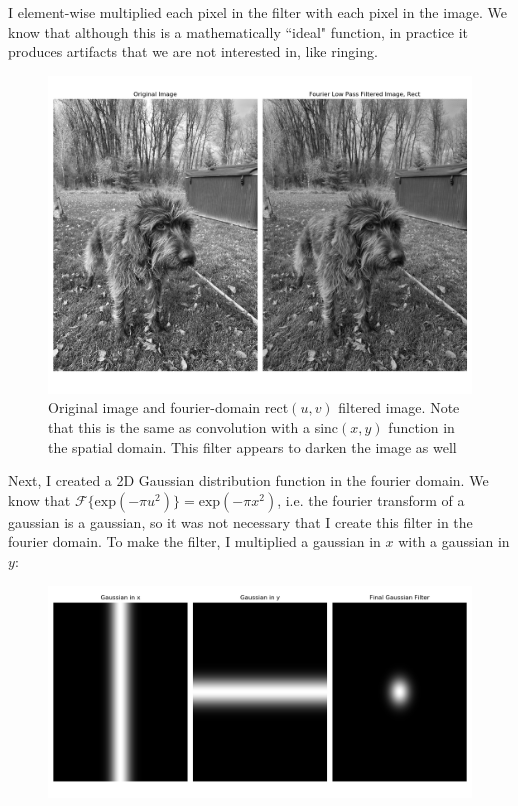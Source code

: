 \documentclass[]{article}
\begin{document}
	
	I element-wise multiplied each pixel in the filter with each pixel in the image. We know that although this is a mathematically ``ideal" function, in practice it produces artifacts that we are not interested in, like ringing. 
	
	\begin{figure}[H]
		\centering
		\includegraphics[width=6.5in]{p1_output/img_0_f_rect.png}
		\caption{Original image and fourier-domain rect$(u,v)$ filtered image. Note that this is the same as convolution with a sinc$(x,y)$ function in the spatial domain. This filter appears to darken the image as well}
	\end{figure}
	
	
	Next, I created a 2D Gaussian distribution function in the fourier domain. We know that $\mathcal{F} \{\text{exp}(-\pi u^2)\} = \text{exp}(-\pi x^2)$, i.e. the fourier transform of a gaussian is a gaussian, so it was not necessary that I create this filter in the fourier domain. To make the filter, I multiplied a gaussian in $x$ with a gaussian in $y$:
	\begin{figure}[H]
		\centering
		\includegraphics[width=6in]{p1_output/gaussian_filter.png}
		\label{enumeratred_mse}
	\end{figure}
\end{document}
